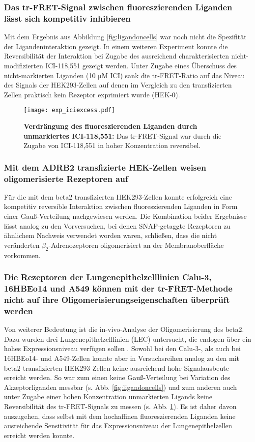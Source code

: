 \subsubsection{Das tr-FRET-Signal zwischen fluoreszierenden Liganden lässt sich kompetitiv inhibieren}

Mit dem Ergebnis aus Abbildung \ref{fig:ligandoncells} war noch nicht die Spezifität der Ligandeninteraktion gezeigt. In einem weiteren Experiment konnte die Reversibilität der Interaktion bei Zugabe des ausreichend charakterisierten nicht-modifizierten ICI-118,551 gezeigt werden. Unter Zugabe eines Überschuss des nicht-markierten Liganden (10 \si{\micro M} ICI) sank die tr-FRET-Ratio auf das Niveau des Signals der HEK293-Zellen auf denen im Vergleich zu den transfizierten Zellen praktisch kein Rezeptor exprimiert wurde (HEK-0).

\begin{figure}[htbp]
	\centering
    \texttt{[image: exp\_iciexcess.pdf]}
    \caption{\textbf{Verdrängung des fluoreszierenden Liganden durch unmarkiertes ICI-118,551:} Das tr-FRET-Signal war durch die Zugabe von ICI-118,551 in hoher Konzentration reversibel.} 
    \label{fig:iciexcess}
\end{figure}

\subsubsection{Mit dem ADRB2 transfizierte HEK-Zellen weisen oligomerisierte Rezeptoren auf}
Für die mit dem \gls{beta2} transfizierten HEK293-Zellen konnte erfolgreich eine kompetitiv reversible Interaktion zwischen fluoreszierenden Liganden in Form einer Gauß-Verteilung nachgewiesen werden. Die Kombination beider Ergebnisse lässt analog zu den Vorversuchen, bei denen SNAP-getaggte Rezeptoren zu ähnlichem Nachweis verwendet worden waren, schließen, dass die nicht veränderten $\beta_2$-Adrenozeptoren oligomerisiert an der Membranoberfläche vorkommen. 

\subsubsection{Die Rezeptoren der Lungenepithelzelllinien Calu-3, 16HBEo14 und A549 können mit der tr-FRET-Methode nicht auf ihre Oligomerisierungseigenschaften überprüft werden}
Von weiterer Bedeutung ist die in-vivo-Analyse der Oligomerisierung des \gls{beta2}. Dazu wurden drei Lungenepithelzelllinien (LEC) untersucht, die endogen über ein hohes Expressionsniveau verfügen sollen \parencite{Abraham2004}. Sowohl bei den Calu-3-, als auch bei 16HBEo14- und A549-Zellen konnte aber in Versuchsreihen analog zu den mit \gls{beta2} transfizierten HEK293-Zellen keine ausreichend hohe Signalausbeute erreicht werden. So war zum einen keine Gauß-Verteilung  bei Variation des Akzeptorliganden messbar (s. Abb. \ref{fig:ligandoncells}) und zum anderen auch unter Zugabe einer hohen Konzentration unmarkierten Ligands keine Reversibilität des tr-FRET-Signals zu messen (s. Abb. \ref{fig:iciexcess}). Es ist daher davon auszugehen, dass selbst mit dem hochaffinen fluoreszierenden Liganden keine ausreichende Sensitivität für das Expressionsniveau der Lungenepithelzellen erreicht werden konnte.
